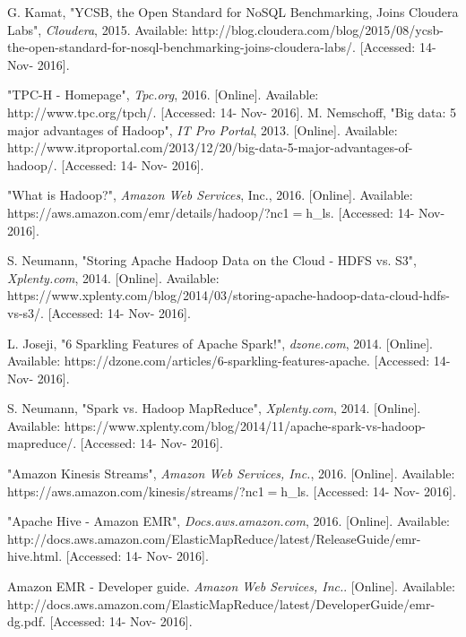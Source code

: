 \begin{thebibliography}{1}
        G. Kamat, "YCSB, the Open Standard for NoSQL Benchmarking, Joins Cloudera Labs", \textit{Cloudera}, 2015. Available: http://blog.cloudera.com/blog/2015/08/ycsb-the-open-standard-for-nosql-benchmarking-joins-cloudera-labs/. [Accessed: 14- Nov- 2016].
        
        "TPC-H - Homepage", \textit{Tpc.org}, 2016. [Online]. Available: http://www.tpc.org/tpch/. [Accessed: 14- Nov- 2016].
        M. Nemschoff, "Big data: 5 major advantages of Hadoop", \textit{IT Pro Portal}, 2013. [Online]. Available: http://www.itproportal.com/2013/12/20/big-data-5-major-advantages-of-hadoop/. [Accessed: 14- Nov- 2016].
        
        "What is Hadoop?", \textit{Amazon Web Services}, Inc., 2016. [Online]. Available: https://aws.amazon.com/emr/details/hadoop/?nc1{$=$}h\_ls. [Accessed: 14- Nov- 2016].
        
        S. Neumann, "Storing Apache Hadoop Data on the Cloud - HDFS vs. S3", \textit{Xplenty.com}, 2014. [Online]. Available: https://www.xplenty.com/blog/2014/03/storing-apache-hadoop-data-cloud-hdfs-vs-s3/. [Accessed: 14- Nov- 2016].
        
        L. Joseji, "6 Sparkling Features of Apache Spark!", \textit{dzone.com}, 2014. [Online]. Available: https://dzone.com/articles/6-sparkling-features-apache. [Accessed: 14- Nov- 2016].
        
        S. Neumann, "Spark vs. Hadoop MapReduce", \textit{Xplenty.com}, 2014. [Online]. Available: https://www.xplenty.com/blog/2014/11/apache-spark-vs-hadoop-mapreduce/. [Accessed: 14- Nov- 2016].
        
        "Amazon Kinesis Streams", \textit{Amazon Web Services, Inc.}, 2016. [Online]. Available: https://aws.amazon.com/kinesis/streams/?nc1{$=$}h\_ls. [Accessed: 14- Nov- 2016].
        
        "Apache Hive - Amazon EMR", \textit{Docs.aws.amazon.com}, 2016. [Online]. Available: http://docs.aws.amazon.com/ElasticMapReduce/latest/ReleaseGuide/emr-hive.html. [Accessed: 14- Nov- 2016].
        
        Amazon EMR - Developer guide. \textit{Amazon Web Services, Inc.}. [Online]. Available: http://docs.aws.amazon.com/ElasticMapReduce/latest/DeveloperGuide/emr-dg.pdf. [Accessed: 14- Nov- 2016].
        

\end{thebibliography}
